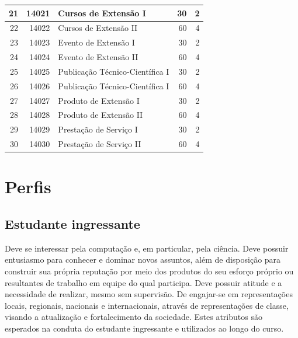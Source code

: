 \documentclass[
	12pt,				%
	openright,			%
  oneside,     %
	a4paper,			%
	english,			%
	french,				%
	spanish,			%
	brazil				%
	]{abntex2}
\begin{document}
\begin{longtable}{r|r|l|r|r}
    21    & 14021 & Cursos de Extensão I & 30    & 2 \\    \hline
    22    & 14022 & Cursos de Extensão II & 60    & 4 \\    \hline
    23    & 14023 & Evento de Extensão I & 30    & 2 \\    \hline
    24    & 14024 & Evento de Extensão II & 60    & 4 \\    \hline
    25    & 14025 & Publicação Técnico-Científica I & 30    & 2 \\    \hline
    26    & 14026 & Publicação Técnico-Científica I & 60    & 4 \\    \hline
    27    & 14027 & Produto de Extensão I & 30    & 2 \\    \hline
    28    & 14028 & Produto de Extensão II & 60    & 4 \\    \hline
    29    & 14029 & Prestação de Serviço I & 30    & 2 \\    \hline
    30    & 14030 & Prestação de Serviço II & 60    & 4 \\    \hline
    \end{longtable}%



%
%



\chapter{Perfis}

\section{Estudante ingressante}

Deve se interessar pela computação e, em particular, pela ciência. Deve possuir
entusiasmo para conhecer e dominar novos assuntos, além de disposição  para
construir sua própria reputação por meio dos produtos do seu esforço  próprio ou
resultantes de trabalho em equipe do qual participa.  Deve possuir atitude e a
necessidade de realizar, mesmo sem supervisão. De engajar-se em representações
locais, regionais, nacionais e internacionais, através de representações de
classe, visando a atualização e fortalecimento da sociedade. Estes atributos são
esperados na conduta do estudante ingressante e utilizados ao longo do curso.
\end{document}

